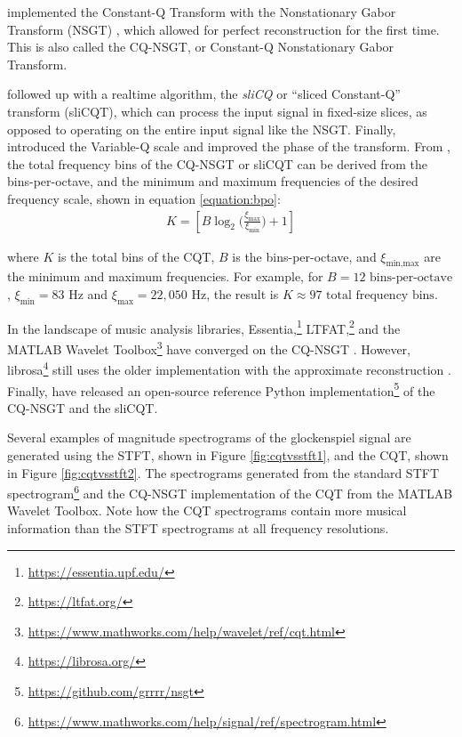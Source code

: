 \documentclass[report.tex]{subfiles}
\begin{document}
\textcite{invertiblecqt} implemented the Constant-Q Transform with the Nonstationary Gabor Transform (NSGT) \parencite{balazs}, which allowed for perfect reconstruction for the first time. This is also called the CQ-NSGT, or Constant-Q Nonstationary Gabor Transform.

\textcite{slicq} followed up with a realtime algorithm, the \textit{sliCQ} or ``sliced Constant-Q'' transform (sliCQT), which can process the input signal in fixed-size slices, as opposed to operating on the entire input signal like the NSGT. Finally, \textcite{variableq1} introduced the Variable-Q scale and improved the phase of the transform. From \textcite{invertiblecqt}, the total frequency bins of the CQ-NSGT or sliCQT can be derived from the bins-per-octave, and the minimum and maximum frequencies of the desired frequency scale, shown in equation \eqref{equation:bpo}:
\begin{align}
	K = [B \log_{2}\big(\frac{\xi_{\text{max}}}{\xi_{\text{min}}}\big) + 1]\tag{10}\label{equation:bpo}
\end{align}

where $K$ is the total bins of the CQT, $B$ is the bins-per-octave, and $\xi_{\text{min,max}}$ are the minimum and maximum frequencies. For example, for $B = 12 \text{ bins-per-octave}$, $\xi_{\text{min}} = 83 \text{ Hz}$ and $\xi_{\text{max}} = 22{,}050 \text{ Hz}$, the result is $K \approx 97 \text{ total frequency bins}$.

In the landscape of music analysis libraries, Essentia,\footnote{\url{https://essentia.upf.edu/}} LTFAT,\footnote{\url{https://ltfat.org/}} and the MATLAB Wavelet Toolbox\footnote{\url{https://www.mathworks.com/help/wavelet/ref/cqt.html}} have converged on the CQ-NSGT \parencite{invertiblecqt, slicq, variableq1}. However, librosa\footnote{\url{https://librosa.org/}} still uses the older implementation with the approximate reconstruction \parencite{klapuricqt}. Finally, \textcite{invertiblecqt} have released an open-source reference Python implementation\footnote{\url{https://github.com/grrrr/nsgt}} of the CQ-NSGT and the sliCQT.

Several examples of magnitude spectrograms of the glockenspiel signal are generated using the STFT, shown in Figure \ref{fig:cqtvsstft1}, and the CQT, shown in Figure \ref{fig:cqtvsstft2}. The spectrograms generated from the standard STFT spectrogram\footnote{\url{https://www.mathworks.com/help/signal/ref/spectrogram.html}} and the CQ-NSGT implementation of the CQT from the MATLAB Wavelet Toolbox. Note how the CQT spectrograms contain more musical information than the STFT spectrograms at all frequency resolutions.
\end{document}
